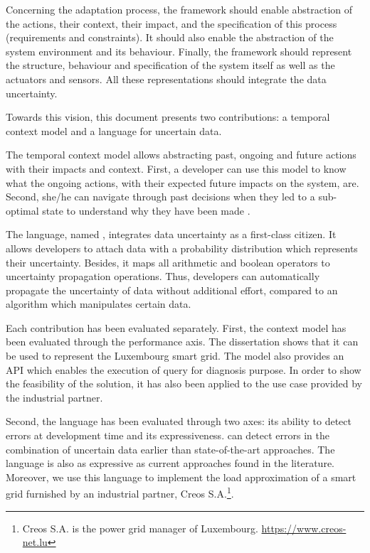 Concerning the adaptation process, the framework should enable abstraction of the actions, their context, their impact, and the specification of this process (requirements and constraints).
It should also enable the abstraction of the system environment and its behaviour.
Finally, the framework should represent the structure, behaviour and specification of the system itself as well as the actuators and sensors.
All these representations should integrate the data uncertainty.

\bigskip
{}
Towards this vision, this document presents two contributions: a temporal context model and a language for uncertain data.

The temporal context model allows abstracting past, ongoing and future actions with their impacts and context.
First, a developer can use this model to know what the ongoing actions, with their expected future impacts on the system, are.
Second, she/he can navigate through past decisions when they led to a sub-optimal state to understand why they have been made .

The language, named \langName, integrates data uncertainty as a first-class citizen.
It allows developers to attach data with a probability distribution which represents their uncertainty.
Besides, it maps all arithmetic and boolean operators to uncertainty propagation operations. 
Thus, developers can automatically propagate the uncertainty of data without additional effort, compared to an algorithm which manipulates certain data.

\bigskip
{}
Each contribution has been evaluated separately. 
First, the context model has been evaluated through the performance axis.
The dissertation shows that it can be used to represent the Luxembourg smart grid.
The model also provides an API which enables the execution of query for diagnosis purpose.
In order to show the feasibility of the solution, it has also been applied to the use case provided by the industrial partner.

Second, the language has been evaluated through two axes: its ability to detect errors at development time and its expressiveness.
\langName{} can detect errors in the combination of uncertain data earlier than state-of-the-art approaches.
The language is also as expressive as current approaches found in the literature.
Moreover, we use this language to implement the load approximation of a smart grid furnished by an industrial partner, Creos S.A.\footnote{Creos S.A. is the power grid manager of Luxembourg. \url{https://www.creos-net.lu}}.

\bigskip
\bigskip
\bigskip
{}

\vfill


